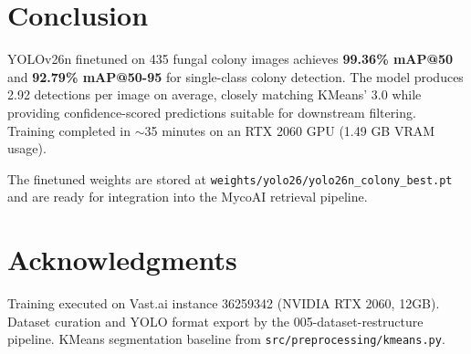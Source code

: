 \documentclass[11pt,a4paper]{article}
\begin{document}
\section{Conclusion}

YOLOv26n finetuned on 435 fungal colony images achieves \textbf{99.36\% mAP@50} and \textbf{92.79\% mAP@50-95} for single-class colony detection. The model produces 2.92 detections per image on average, closely matching KMeans' 3.0 while providing confidence-scored predictions suitable for downstream filtering. Training completed in $\sim$35 minutes on an RTX 2060 GPU (1.49 GB VRAM usage).

The finetuned weights are stored at \texttt{weights/yolo26/yolo26n\_colony\_best.pt} and are ready for integration into the MycoAI retrieval pipeline.

\section*{Acknowledgments}

Training executed on Vast.ai instance 36259342 (NVIDIA RTX 2060, 12GB). Dataset curation and YOLO format export by the 005-dataset-restructure pipeline. KMeans segmentation baseline from \texttt{src/preprocessing/kmeans.py}.
\end{document}
